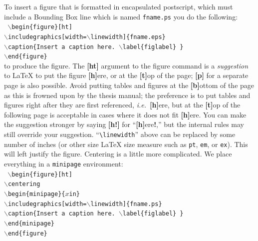 To insert a figure that is formatted in encapsulated postscript, which
must include a Bounding Box line which is named \texttt{fname.ps} you
do the following:
\\
\texttt{ \hspace*{0.5in} $\backslash$begin\{figure\}[ht]
  \\
  \hspace*{0.75in}
  $\backslash$includegraphics[width=$\backslash$linewidth]\{fname.eps\}
  \\
  \hspace*{0.75in} $\backslash$caption\{Insert a caption
  here. $\backslash$label\{figlabel\} \}
  \\
  \hspace*{0.5in} $\backslash$end\{figure\} }
\\
to produce the figure. The \textbf{[ht]} argument to the figure
command is a \emph{suggestion} to \LaTeX{} to put the figure
\textbf{[h]}ere, or at the \textbf{[t]}op of the page; \textbf{[p]}
for a separate page is also possible.
Avoid putting tables and
figures at the \textbf{[b]}ottom of the page as this is frowned upon
by the thesis manual; the
preference is to put tables and figures right
after they are first referenced, \emph{i.e.}\ \textbf{[h]}ere, but
at the \textbf{[t]}op of the following page is acceptable in cases
where it does not fit \textbf{[h]}ere.  You can make the suggestion
stronger by saying \textbf{[h!]}  for ``\textbf{[h]}ere\textbf{!},''
but the internal rules may still override your suggestion.
``\verb+\linewidth+'' above can be replaced by some
number of inches (or other size \LaTeX{} size measure such as
\texttt{pt}, \texttt{em}, or \texttt{ex}).  This will left justify the
figure.  Centering is a little more complicated.  We place everything
in a \texttt{minipage} environment:
\\
\texttt{ \hspace*{0.5in} $\backslash$begin\{figure\}[ht]
  \\
  \hspace*{0.75in} $\backslash$centering
  \\
  \hspace*{0.75in} $\backslash$begin\{minipage\}\{$x$in\}
  \\
  \hspace*{1.0in}
  $\backslash$includegraphics[width=$\backslash$linewidth]\{fname.ps\}
  \\
  \hspace*{1.0in} $\backslash$caption\{Insert a caption
  here. $\backslash$label\{figlabel\} \}
  \\
  \hspace*{0.75in} $\backslash$end\{minipage\}
  \\
  \hspace*{0.5in} $\backslash$end\{figure\} }

